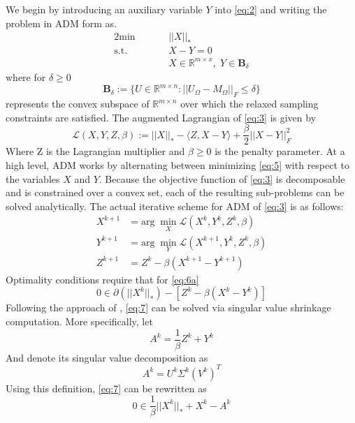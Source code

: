 \documentclass{article}
\begin{document}
We begin by introducing an auxiliary variable $Y$ into \ref{eq:2} and writing the problem in ADM form as.  
\begin{alignat}{2} \label{eq:3}
\textrm{min}& \quad &&||X||_* \\
\textrm{s.t.}& &&X -Y = 0 \nonumber\\
& &&X \in \mathbb{R}^{m \times x}, \; Y \in \textbf{B}_\delta \nonumber
\end{alignat}
where for $\delta \ge 0$
\begin{equation}
\textbf{B}_\delta := \{ U \in \mathbb{R}^{m \times n}: ||U_\Omega - M_\Omega||_F \le \delta\}
\end{equation} 
represents the convex subspace of $\mathbb{R}^{m \times n}$ over which the relaxed sampling constraints are satisfied. 
The augmented Lagrangian of \ref{eq:3} is given by
\begin{equation} \label{eq:5}
\mathcal{L}(X,Y,Z,\beta) := ||X||_* - \langle Z, X - Y \rangle + \frac \beta 2 ||X-Y||^2_F
\end{equation} 
Where Z is the Lagrangian multiplier and $\beta \ge 0$ is the penalty parameter.  At a high level, ADM works by alternating between minimizing \ref{eq:5} with respect to the variables $X$ and $Y$.  Because the objective function of \ref{eq:3} is decomposable and is constrained over a convex set, each of the resulting sub-problems can be solved analytically.  The actual iterative scheme for ADM of \ref{eq:3} is as follows:
\begin{subequations}
\begin{align}
X^{k+1} &= \textrm{arg} \; \min_X \mathcal{L}(X^k,Y^k,Z^k,\beta) \label{eq:6a}\\
Y^{k+1} &= \textrm{arg} \; \min_Y \mathcal{L}(X^{k+1},Y^k,Z^k,\beta) \label{eq:6b}\\
Z^{k+1} &= Z^k - \beta \left( X^{k+1} - Y^{k+1} \right) \label{eq:6c}
\end{align} 
\end{subequations}
Optimality conditions require that for \ref{eq:6a} 
\begin{equation} \label{eq:7}
0 \in \partial (||X^k||_*) - \left[ Z^k - \beta (X^k - Y^k) \right]
\end{equation} 
Following the approach of \cite{Cai}, \ref{eq:7} can be solved via singular value shrinkage computation.  More specifically, let
$$
A^k = \frac 1 \beta Z^k + Y^k
$$
And denote its singular value decomposition as 
$$
A^k = U^k \Sigma^k (V^k)^T
$$
Using this definition, \ref{eq:7} can be rewritten as 
\begin{equation} \label{eq:8}
0 \in \frac 1 \beta ||X^k||_* + X^k - A^k
\end{equation}
\end{document}
